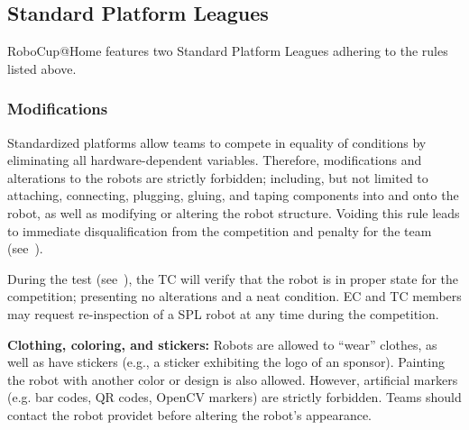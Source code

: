 \subsection{Standard Platform Leagues}
RoboCup@Home features two Standard Platform Leagues adhering to the rules listed above.

\subsubsection{Modifications}
\label{rule:spl-mods}
Standardized platforms allow teams to compete in equality of conditions by eliminating all hardware-dependent variables.
Therefore, modifications and alterations to the robots are strictly forbidden; including, but not limited to attaching, connecting, plugging, gluing, and taping components into and onto the robot, as well as modifying or altering the robot structure.
Voiding this rule leads to immediate disqualification from the competition and penalty for the team (see~).

During the  test (see~), the TC will verify that the robot is in proper state for the competition; presenting no alterations and a neat condition.
EC and TC members may request re-inspection of a SPL robot at any time during the competition.

\textbf{Clothing, coloring, and stickers:} Robots are allowed to \enquote{wear} clothes, as well as have stickers (e.g., a sticker exhibiting the logo of an sponsor).
Painting the robot with another color or design is also allowed. 
However, artificial markers (e.g. bar codes, QR codes, OpenCV markers) are strictly forbidden. 
Teams should contact the robot providet before altering the robot's appearance.



